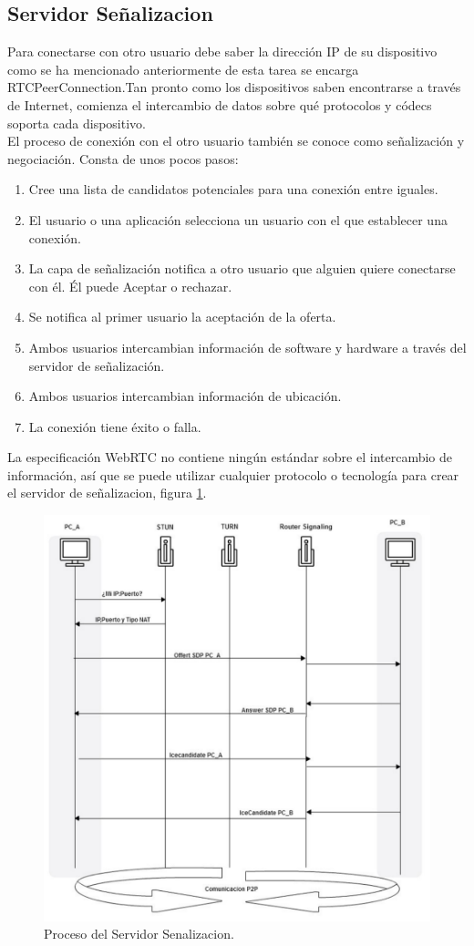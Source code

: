 \subsection{Servidor Señalizacion}
Para conectarse con otro usuario debe saber la dirección IP de su dispositivo como se ha mencionado anteriormente de esta tarea se encarga RTCPeerConnection.Tan pronto como los dispositivos saben encontrarse a través de Internet, comienza el intercambio de datos sobre qué protocolos y códecs soporta cada dispositivo.
\\El proceso de conexión con el otro usuario también se conoce como señalización y negociación. Consta de unos pocos pasos:
\begin{enumerate}
\item Cree una lista de candidatos potenciales para una conexión entre iguales.
\item El usuario o una aplicación selecciona un usuario con el que establecer una conexión.
\item La capa de señalización notifica a otro usuario que alguien quiere conectarse con él. Él puede Aceptar o rechazar.
\item Se notifica al primer usuario la aceptación de la oferta.
\item Ambos usuarios intercambian información de software y hardware a través del servidor de señalización.
\item Ambos usuarios intercambian información de ubicación.
\item La conexión tiene éxito o falla.
\end{enumerate}
La especificación WebRTC no contiene ningún estándar sobre el intercambio de información, así que se puede  utilizar cualquier protocolo o tecnología para crear el servidor de señalizacion, figura \ref{fig:procesoSenalizacion}.
\begin{figure}[!h]
\begin{center}
   \includegraphics[width=0.5\linewidth]{Figures/procesoSenalizacion}
	\decoRule
	\caption[Proceso del Servidor Senalizacion]{Proceso del Servidor Senalizacion.}
\label{fig:procesoSenalizacion}
\end{center}
\end{figure}
